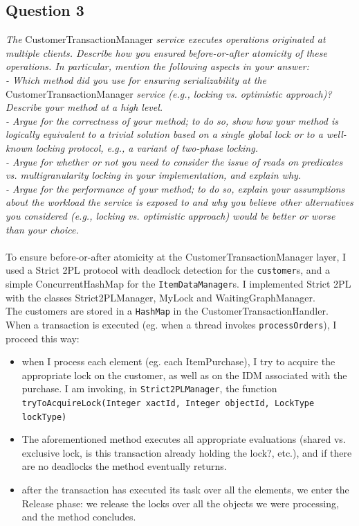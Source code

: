 \documentclass[paper=a4, fontsize=11pt]{scrartcl} %
\numberwithin{equation}{section} %
\numberwithin{figure}{section} %
\numberwithin{table}{section} %
\begin{document}
\subsection{Question 3}

\textit{The }CustomerTransactionManager\textit{ service executes
operations originated at multiple clients. Describe how you ensured before-or-after atomicity of these
operations. In particular, mention the following aspects in your answer:}\\
\textit{ - Which method did you use for ensuring serializability at the}
CustomerTransactionManager \textit{service (e.g., locking vs. optimistic approach)? Describe
your method at a high level.\\
 - Argue for the correctness of your method; to do so, show how your method is logically equivalent
to a trivial solution based on a single global lock or to a well-known locking protocol, e.g., a
variant of two-phase locking.\\
 - Argue for whether or not you need to consider the issue of reads on predicates vs. multigranularity
locking in your implementation, and explain why.\\
 - Argue for the performance of your method; to do so, explain your assumptions about the
workload the service is exposed to and why you believe other alternatives you considered (e.g.,
locking vs. optimistic approach) would be better or worse than your choice.\\
}
~\\
To ensure before-or-after atomicity at the CustomerTransactionManager layer, I used a Strict 2PL protocol with deadlock detection for the \verb|customer|s, and a simple ConcurrentHashMap for the \verb|ItemDataManager|s. I implemented Strict 2PL with the classes Strict2PLManager, MyLock and WaitingGraphManager.\\
The customers are stored in a \verb|HashMap| in the CustomerTransactionHandler. When a transaction is executed (eg. when a thread invokes \verb|processOrders|), I proceed this way:
\begin{itemize}
\item when I process each element (eg. each ItemPurchase), I try to acquire the appropriate lock on the customer, as well as on the IDM associated with the purchase. I am invoking, in \verb|Strict2PLManager|, the function \\\verb|tryToAcquireLock(Integer xactId, Integer objectId, LockType lockType)|
\item The aforementioned method executes all appropriate evaluations (shared vs. exclusive lock, is this transaction already holding the lock?, etc.), and if there are no deadlocks the method eventually returns.
\item after the transaction has executed its task over all the elements, we enter the Release phase: we release the locks over all the objects we were processing, and the method concludes.
\end{itemize}
\end{document}
